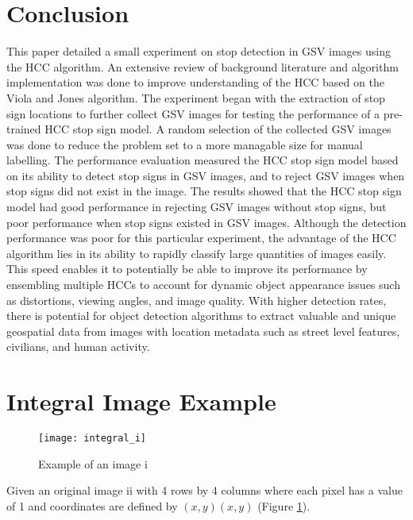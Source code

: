 \section{Conclusion} \label{conclusion}

This paper detailed a small experiment on stop detection in GSV images using the HCC algorithm. An extensive review of background literature and algorithm implementation was done to improve understanding of the HCC based on the Viola and Jones algorithm. The experiment began with the extraction of stop sign locations to further collect GSV images for testing the performance of a pre-trained HCC stop sign model. A random selection of the collected GSV images was done to reduce the problem set to a more managable size for manual labelling. The performance evaluation measured the HCC stop sign model based on its ability to detect stop signs in GSV images, and to reject GSV images when stop signs did not exist in the image. The results showed that the HCC stop sign model had good performance in rejecting GSV images without stop signs, but poor performance when stop signs existed in GSV images. Although the detection performance was poor for this particular experiment, the advantage of the HCC algorithm lies in its ability to rapidly classify large quantities of images easily. This speed enables it to potentially be able to improve its performance by ensembling multiple HCCs to account for dynamic object appearance issues such as distortions, viewing angles, and image quality. With higher detection rates, there is potential for object detection algorithms to extract valuable and unique geospatial data from images with location metadata such as street level features, civilians, and human activity.




\appendix

\section{Integral Image Example} \label{integral-image-example}

\begin{figure}[H]
  \texttt{[image: integral\_i]}
  \caption{Example of an image i}
  \label{fig:integral-i}
\end{figure}

Given an original image ii with 4 rows by 4 columns where each pixel has a value of 1 and coordinates are defined by $(x,y)(x,y)$ (Figure \ref{fig:integral-i}).

